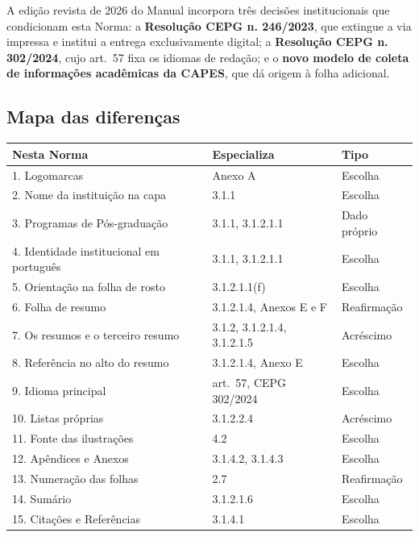 \documentclass[a4paper,11pt]{article}
\begin{document}
A edição revista de 2026 do Manual incorpora três decisões institucionais que
condicionam esta Norma: a \textbf{Resolução CEPG n. 246/2023}, que extingue a
via impressa e institui a entrega exclusivamente digital; a \textbf{Resolução
CEPG n. 302/2024}, cujo art.\ 57 fixa os idiomas de redação; e o \textbf{novo
modelo de coleta de informações acadêmicas da CAPES}, que dá origem à folha
adicional.

\subsection*{Mapa das diferenças}

\begin{center}
\begin{tabular}{@{}p{6.6cm}p{4.4cm}l@{}}
\toprule
\textbf{Nesta Norma} & \textbf{Especializa} & \textbf{Tipo}\\
\midrule
1. Logomarcas                          & Anexo A                & Escolha\\
2. Nome da instituição na capa         & 3.1.1                  & Escolha\\
3. Programas de Pós-graduação          & 3.1.1, 3.1.2.1.1       & Dado próprio\\
4. Identidade institucional em português & 3.1.1, 3.1.2.1.1     & Escolha\\
5. Orientação na folha de rosto        & 3.1.2.1.1(f)           & Escolha\\
6. Folha de resumo                     & 3.1.2.1.4, Anexos E e F & Reafirmação\\
7. Os resumos e o terceiro resumo     & 3.1.2, 3.1.2.1.4, 3.1.2.1.5 & Acréscimo\\
8. Referência no alto do resumo        & 3.1.2.1.4, Anexo E     & Escolha\\
9. Idioma principal                    & art.\ 57, CEPG 302/2024 & Escolha\\
10. Listas próprias                    & 3.1.2.2.4              & Acréscimo\\
11. Fonte das ilustrações              & 4.2                    & Escolha\\
12. Apêndices e Anexos                 & 3.1.4.2, 3.1.4.3       & Escolha\\
13. Numeração das folhas               & 2.7                    & Reafirmação\\
14. Sumário                            & 3.1.2.1.6              & Escolha\\
15. Citações e Referências             & 3.1.4.1                & Escolha\\
\bottomrule
\end{tabular}
\end{center}
\end{document}
